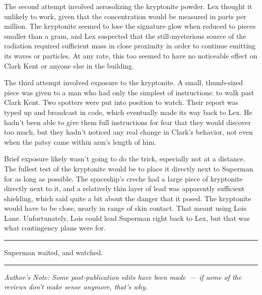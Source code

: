 The second attempt involved aerosolizing the kryptonite powder. Lex
thought it unlikely to work, given that the concentration would be
measured in parts per million. The kryptonite seemed to lose the
signature glow when reduced to pieces smaller than a gram, and Lex
suspected that the still‐mysterious source of the radiation required
sufficient mass in close proximity in order to continue emitting its
waves or particles. At any rate, this too seemed to have no noticeable
effect on Clark Kent or anyone else in the building.

The third attempt involved exposure to the kryptonite. A small,
thumb‐sized piece was given to a man who had only the simplest of
instructions: to walk past Clark Kent. Two spotters were put into
position to watch. Their report was typed up and broadcast in code,
which eventually made its way back to Lex. He hadn't been able to give
them full instructions for fear that they would discover too much, but
they hadn't noticed any real change in Clark's behavior, not even when
the patsy came within arm's length of him.

Brief exposure likely wasn't going to do the trick, especially not at a
distance. The fullest test of the kryptonite would be to place it
directly next to Superman for as long as possible. The spaceship's
creche had a large piece of kryptonite directly next to it, and a
relatively thin layer of lead was apparently sufficient shielding, which
said quite a bit about the danger that it posed. The kryptonite would
have to be close, nearly in range of skin contact. That meant using Lois
Lane. Unfortunately, Lois could lead Superman right back to Lex, but
that was what contingency plans were for.

\begin{center}\rule{0.5\linewidth}{0.5pt}\end{center}

Superman waited, and watched.

\begin{center}\rule{0.5\linewidth}{0.5pt}\end{center}

\emph{Author's Note: Some post‐publication edits have been made~--- if
some of the reviews don't make sense anymore, that's why.}

